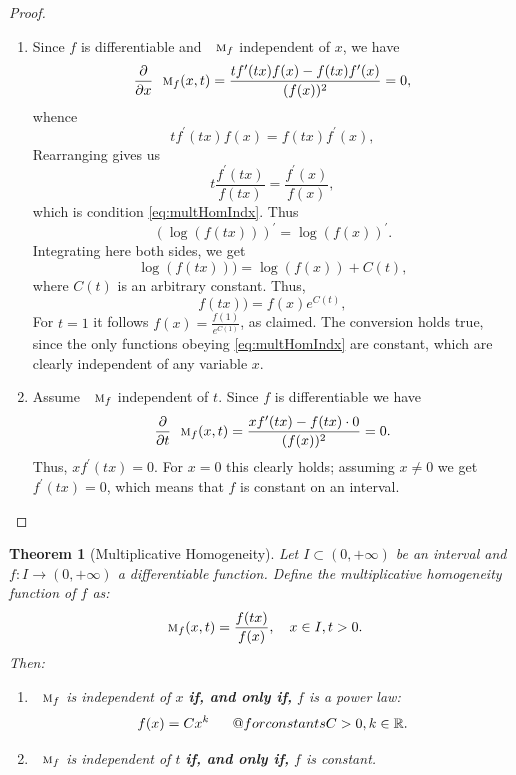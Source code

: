 \documentclass{amsart}
\makeatletter
\newtheorem{theorem}{Theorem}
\theoremstyle{plain}
\numberwithin{equation}{section}
\def\RIfM@{\relax\ifmmode}%
\def\RIfM@{\relax\protect\ifmmode}
\def\text{\RIfM@\expandafter\text@\else\expandafter\mbox\fi}
\def\text@#1{\mathchoice
   {\textdef@\displaystyle\f@size{#1}}%
   {\textdef@\textstyle\tf@size{\firstchoice@false #1}}%
   {\textdef@\textstyle\sf@size{\firstchoice@false #1}}%
   {\textdef@\textstyle \ssf@size{\firstchoice@false #1}}%
   \glb@settings}
\def\textdef@#1#2#3{\hbox{{%
                    \everymath{#1}%
                    \let\f@size#2\selectfont
                    #3}}}
\newif\iffirstchoice@
\newcommand{\mh}{\textsc{m}}
\makeatother
\begin{document}
\begin{proof} 
\begin{enumerate}
    \item 
    Since $f$ is differentiable and $\mh_f$ independent of $x$, we have
    \begin{equation*}
\frac{\partial}{\partial x} \mh_f(x,t) = 
\frac{t f^\prime (tx) f(x) - f(tx) f^\prime (x)}{(f(x))^2}
=0,
\end{equation*}
whence
\begin{equation*}
t f^\prime (tx) f(x) = f(tx) f^\prime (x),
\end{equation*}
Rearranging gives us
\begin{equation*}
t \frac{f^\prime (tx)}{f(tx)}  =
\frac{f^\prime (x)}{f(x)},
\end{equation*}
which is condition \eqref{eq:multHomIndx}.
Thus
\begin{equation*}
(\log(f(tx)))^\prime = \log(f (x))^\prime.
\end{equation*}
Integrating here both sides, we get
\begin{equation*}
\log(f(tx))) = \log(f(x)) + C(t),
\end{equation*}
where $C(t)$ is an arbitrary constant.
Thus,
\begin{equation*}
f(tx)) = f(x)  e^{C(t)},
\end{equation*}
For $t=1$ it follows $f(x)=\frac{f(1)}{e^{C(1)}}$, as claimed.
The conversion holds true,
since the only functions obeying \eqref{eq:multHomIndx} are constant, which are clearly independent of any variable $x$.

  \item 
Assume $\mh_f$ independent of $t$.
Since $f$ is differentiable we have
    \begin{equation*}
\frac{\partial}{\partial t} \mh_f(x,t) = 
\frac{x f^\prime (tx) - f(tx) \cdot 0}{(f(x))^2}
=0.
\end{equation*}
Thus, $x f^\prime (tx) =0$.
For $x=0$ this clearly holds;
assuming $x \neq 0$ 
we get $f^\prime (tx) =0$,
which means that $f$ is constant on an interval.
\end{enumerate} 
\end{proof}
\fi



\begin{theorem}[Multiplicative Homogeneity]
Let \( I \subset (0, +\infty) \) be an interval and \( f:I \to (0, +\infty) \) a differentiable function. 
Define the \emph{multiplicative homogeneity function} of \( f \) as:
\[
\mh_f(x,t) = \frac{f(tx)}{f(x)}, \quad x \in I, t > 0.
\]
Then:
\begin{enumerate}
    \item \( \mh_f \) is independent of \( x \) \textbf{if, and only if,} \( f \) is a power law:
    \[
    f(x) = Cx^k \quad \text{for constants } C > 0, k \in \mathbb{R}.
    \]
    \item \( \mh_f \) is independent of \( t \) \textbf{if, and only if,} \( f \) is constant.
\end{enumerate}
\end{theorem}
\end{document}
